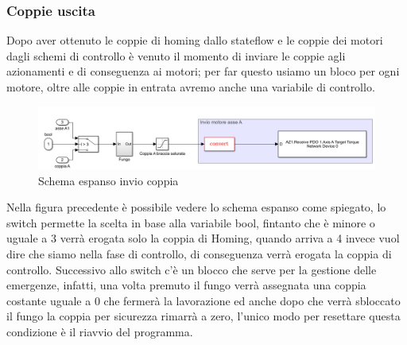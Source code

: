 \subsubsection*{Coppie uscita}
Dopo aver ottenuto le coppie di homing dallo stateflow e le coppie dei motori dagli schemi di controllo è venuto il momento di inviare le coppie agli azionamenti e di conseguenza ai motori; per far questo usiamo un bloco per ogni motore, oltre alle coppie in entrata avremo anche una variabile di controllo. 
\begin{figure}[ht]
	\begin{center}
		\includegraphics[scale=0.55]{Immagini/Sperimentale/Saturatore}
		\caption{Schema espanso invio coppia}
			\label{fig:CoppieoutExpanded}
	\end{center}
\end{figure}
Nella figura precedente è possibile vedere lo schema espanso come spiegato, lo switch permette la scelta in base alla variabile bool, fintanto che è minore o uguale a 3 verrà erogata solo la coppia di Homing, quando arriva a 4 invece vuol dire che siamo nella fase di controllo, di conseguenza verrà erogata la coppia di controllo. Successivo allo switch c'è un blocco che serve per la gestione delle emergenze, infatti, una volta premuto il fungo verrà assegnata una coppia costante uguale a 0 che fermerà la lavorazione ed anche dopo che verrà sbloccato il fungo la coppia per sicurezza rimarrà a zero, l'unico modo per resettare questa condizione è il riavvio del programma.
